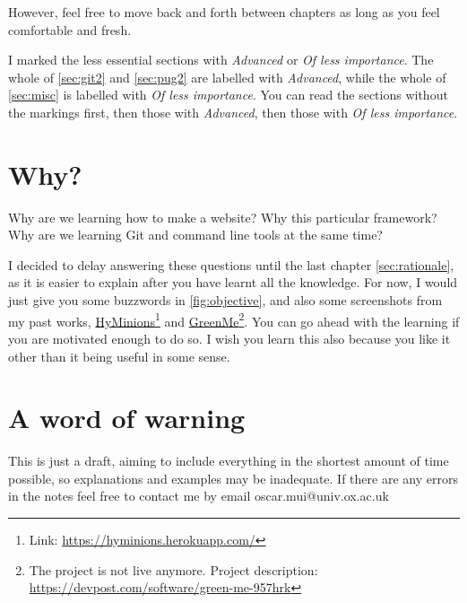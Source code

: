 However, feel free to move back and forth between chapters as long as you feel comfortable and fresh. 
\vspace{6mm}

I marked the less essential sections with \textit{Advanced} or \textit{Of less importance}. The whole of \cref{sec:git2} and \cref{sec:pug2} are labelled with \textit{Advanced}, while the whole of \cref{sec:misc} is labelled with \textit{Of less importance}. You can read the sections without the markings first, then those with \textit{Advanced}, then those with \textit{Of less importance}.

\section{Why?}

Why are we learning how to make a website? Why this particular framework? Why are we learning Git and command line tools at the same time?

I decided to delay answering these questions until the last chapter \cref{sec:rationale}, as it is easier to explain after you have learnt all the knowledge. For now, I would just give you some buzzwords in \cref{fig:objective}, and also some screenshots from my past works, \href{https://hyminions.herokuapp.com/}{HyMinions}\footnote{Link: \href{https://hyminions.herokuapp.com/}{https://hyminions.herokuapp.com/}} and \href{https://devpost.com/software/green-me-957hrk}{GreenMe}\footnote{The project is not live anymore. Project description: \href{https://devpost.com/software/green-me-957hrk}{https://devpost.com/software/green-me-957hrk}}. You can go ahead with the learning if you are motivated enough to do so. I wish you learn this also because you like it other than it being useful in some sense.
 
\section{A word of warning}

This is just a draft, aiming to include everything in the shortest amount of time possible, so explanations and examples may be inadequate. If there are any errors in the notes feel free to contact me by email oscar.mui@univ.ox.ac.uk

